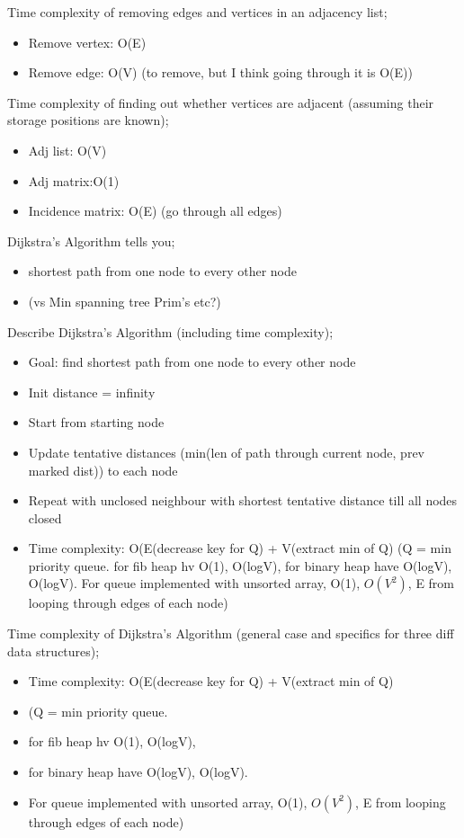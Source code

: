 \documentclass{article}
\begin{document}
Time complexity of removing edges and vertices in an adjacency list; \begin{itemize} \item Remove vertex: O(E) \item Remove edge: O(V) (to remove, but I think going through it is O(E))\end{itemize} 

Time complexity of finding out whether vertices are adjacent (assuming their storage positions are known); \begin{itemize} \item Adj list: O(V) \item Adj matrix:O(1) \item Incidence matrix: O(E) (go through all edges) \end{itemize} 

Dijkstra's Algorithm tells you; \begin{itemize} \item shortest path from one node to every other node \item (vs Min spanning tree Prim's etc?) \end{itemize}

Describe Dijkstra's Algorithm (including time complexity); \begin{itemize} \item Goal: find shortest path from one node to every other node \item Init distance = infinity \item Start from starting node \item Update tentative distances (min(len of path through current node, prev marked dist)) to each node \item Repeat with unclosed neighbour with shortest tentative distance till all nodes closed \item Time complexity: O(E(decrease key for Q) + V(extract min of Q) (Q = min priority queue. for fib heap hv  O(1), O(logV), for binary heap have O(logV), O(logV). For queue implemented with unsorted array, O(1), $O(V^2)$, E from looping through edges of each node) \end{itemize}

Time complexity of Dijkstra's Algorithm (general case and specifics for three diff data structures); \begin{itemize} \item Time complexity: O(E(decrease key for Q) + V(extract min of Q) \item (Q = min priority queue. \item for fib heap hv  O(1), O(logV), \item for binary heap have O(logV), O(logV). \item For queue implemented with unsorted array, O(1), $O(V^2)$, E from looping through edges of each node) \end{itemize}
\end{document}
